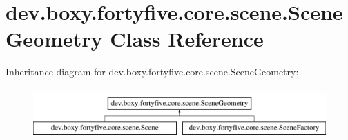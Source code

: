 \hypertarget{classdev_1_1boxy_1_1fortyfive_1_1core_1_1scene_1_1_scene_geometry}{
\section{dev.boxy.fortyfive.core.scene.SceneGeometry Class Reference}
\label{dd/d3e/classdev_1_1boxy_1_1fortyfive_1_1core_1_1scene_1_1_scene_geometry}
}
Inheritance diagram for dev.boxy.fortyfive.core.scene.SceneGeometry:\begin{figure}[H]
\begin{center}
\leavevmode
\includegraphics[height=1.964912cm]{dd/d3e/classdev_1_1boxy_1_1fortyfive_1_1core_1_1scene_1_1_scene_geometry}
\end{center}
\end{figure}
